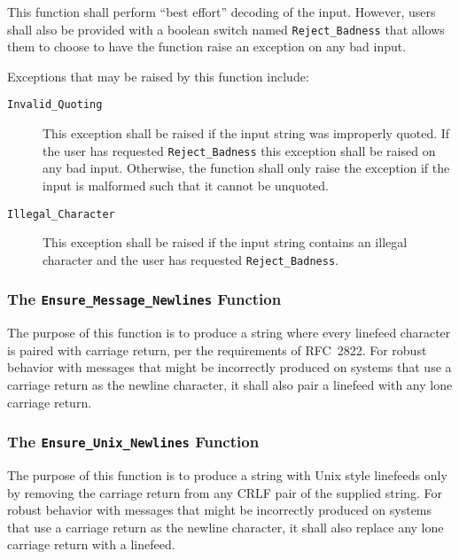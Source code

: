 \documentclass[11pt]{article}
\begin{document}
This function shall perform ``best effort'' decoding of the input.
However, users shall also be provided with a boolean switch named
\texttt{Reject\_Badness} that allows them to choose to have the
function raise an exception on any bad input.

Exceptions that may be raised by this function include:

\begin{description}

\item[\texttt{Invalid\_Quoting}] This exception shall be raised if the
  input string was improperly quoted. If the user has requested
  \texttt{Reject\_Badness} this exception shall be raised on any bad
  input. Otherwise, the function shall only raise the exception if the
  input is malformed such that it cannot be unquoted.

\item[\texttt{Illegal\_Character}] This exception shall be raised if
  the input string contains an illegal character and the user has
  requested \texttt{Reject\_Badness}.

\end{description}

\subsubsection{The \texttt{Ensure\_Message\_Newlines} Function}

The purpose of this function is to produce a string where every
linefeed character is paired with carriage return, per the
requirements of RFC~2822. For robust behavior with messages that might
be incorrectly produced on systems that use a carriage return as the
newline character, it shall also pair a linefeed with any lone carriage
return.

\subsubsection{The \texttt{Ensure\_Unix\_Newlines} Function}

The purpose of this function is to produce a string with Unix style
linefeeds only by removing the carriage return from any CRLF pair of
the supplied string. For robust behavior with messages that might be
incorrectly produced on systems that use a carriage return as the
newline character, it shall also replace any lone carriage return with
a linefeed.

\end{document}
